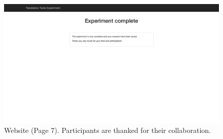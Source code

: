 \begin{figure}[h]
\myfloatalign
\includegraphics[width=\textwidth]{img/web/web_8.png}
\caption{Website (Page 7). Participants are thanked for their collaboration.}
\label{fig:web_thanks}
\end{figure}
